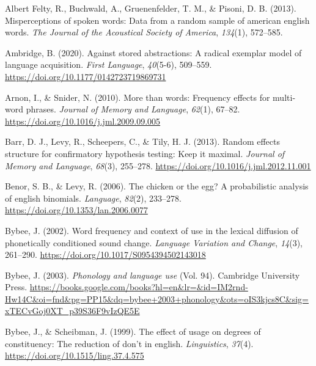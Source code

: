 \documentclass[
  12pt,
]{scrartcl}
\newlength{\cslhangindent}
\newenvironment{CSLReferences}[2] %
 {\begin{list}{}{%
  \setlength{\itemindent}{0pt}
  \setlength{\leftmargin}{0pt}
  \setlength{\parsep}{0pt}
  \ifodd #1
   \setlength{\leftmargin}{\cslhangindent}
   \setlength{\itemindent}{-1\cslhangindent}
  \fi
  \setlength{\itemsep}{#2\baselineskip}}}
 {\end{list}}
\begin{document}
\label{refs}
\begin{CSLReferences}{1}{0}
Albert Felty, R., Buchwald, A., Gruenenfelder, T. M., \& Pisoni, D. B.
(2013). Misperceptions of spoken words: Data from a random sample of
american english words. \emph{The Journal of the Acoustical Society of
America}, \emph{134}(1), 572--585.

Ambridge, B. (2020). Against stored abstractions: A radical exemplar
model of language acquisition. \emph{First Language}, \emph{40}(5-6),
509--559. \url{https://doi.org/10.1177/0142723719869731}

Arnon, I., \& Snider, N. (2010). More than words: Frequency effects for
multi-word phrases. \emph{Journal of Memory and Language}, \emph{62}(1),
67--82. \url{https://doi.org/10.1016/j.jml.2009.09.005}

Barr, D. J., Levy, R., Scheepers, C., \& Tily, H. J. (2013). Random
effects structure for confirmatory hypothesis testing: Keep it maximal.
\emph{Journal of Memory and Language}, \emph{68}(3), 255--278.
\url{https://doi.org/10.1016/j.jml.2012.11.001}

Benor, S. B., \& Levy, R. (2006). The chicken or the egg? A
probabilistic analysis of english binomials. \emph{Language},
\emph{82}(2), 233--278. \url{https://doi.org/10.1353/lan.2006.0077}

Bybee, J. (2002). Word frequency and context of use in the lexical
diffusion of phonetically conditioned sound change. \emph{Language
Variation and Change}, \emph{14}(3), 261--290.
\url{https://doi.org/10.1017/S0954394502143018}

Bybee, J. (2003). \emph{Phonology and language use} (Vol. 94). Cambridge
University Press.
\url{https://books.google.com/books?hl=en&lr=&id=IM2rnd-Hw14C&oi=fnd&pg=PP15&dq=bybee+2003+phonology&ots=oIS3kjcs8C&sig=xTECvGoj0XT_p39S36F9vIzQE5E}

Bybee, J., \& Scheibman, J. (1999). The effect of usage on degrees of
constituency: The reduction of don't in english. \emph{Linguistics},
\emph{37}(4). \url{https://doi.org/10.1515/ling.37.4.575}


\end{CSLReferences}
\end{document}
